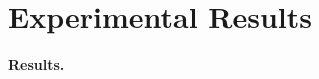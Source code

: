 \documentclass[letterpaper]{article}
\newcommand{\mypar}[1]{{\bf #1.}}
\begin{document}





\section{Experimental Results}\label{sec:exp}



%
%

\mypar{Results}
%

\end{document}
